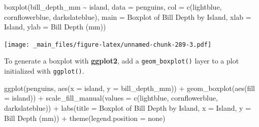 \documentclass[
]{book}
\newenvironment{Shaded}{\begin{snugshade}}{\end{snugshade}}
\newcommand{\AttributeTok}[1]{\textcolor[rgb]{0.77,0.63,0.00}{#1}}
\newcommand{\FunctionTok}[1]{\textcolor[rgb]{0.00,0.00,0.00}{#1}}
\newcommand{\NormalTok}[1]{#1}
\newcommand{\SpecialCharTok}[1]{\textcolor[rgb]{0.00,0.00,0.00}{#1}}
\newcommand{\StringTok}[1]{\textcolor[rgb]{0.31,0.60,0.02}{#1}}
\begin{document}
\begin{Shaded}
\begin{Highlighting}[]
\FunctionTok{boxplot}\NormalTok{(bill\_depth\_mm }\SpecialCharTok{\textasciitilde{}}\NormalTok{ island, }\AttributeTok{data =}\NormalTok{ penguins, }
        \AttributeTok{col =} \FunctionTok{c}\NormalTok{(}\StringTok{\textquotesingle{}lightblue\textquotesingle{}}\NormalTok{, }\StringTok{\textquotesingle{}cornflowerblue\textquotesingle{}}\NormalTok{, }\StringTok{\textquotesingle{}darkslateblue\textquotesingle{}}\NormalTok{),}
        \AttributeTok{main =} \StringTok{\textquotesingle{}Boxplot of Bill Depth by Island\textquotesingle{}}\NormalTok{, }
        \AttributeTok{xlab =} \StringTok{\textquotesingle{}Island\textquotesingle{}}\NormalTok{, }\AttributeTok{ylab =} \StringTok{\textquotesingle{}Bill Depth (mm)\textquotesingle{}}\NormalTok{)}
\end{Highlighting}
\end{Shaded}

\texttt{[image: \_main\_files/figure-latex/unnamed-chunk-289-3.pdf]}

To generate a boxplot with \textbf{ggplot2}, add a \texttt{geom\_boxplot()} layer to a plot initialized with \texttt{ggplot()}.

\begin{Shaded}
\begin{Highlighting}[]
\FunctionTok{ggplot}\NormalTok{(penguins, }\FunctionTok{aes}\NormalTok{(}\AttributeTok{x =}\NormalTok{ island, }\AttributeTok{y =}\NormalTok{ bill\_depth\_mm)) }\SpecialCharTok{+}
  \FunctionTok{geom\_boxplot}\NormalTok{(}\FunctionTok{aes}\NormalTok{(}\AttributeTok{fill =}\NormalTok{ island)) }\SpecialCharTok{+}
  \FunctionTok{scale\_fill\_manual}\NormalTok{(}\AttributeTok{values =} \FunctionTok{c}\NormalTok{(}\StringTok{\textquotesingle{}lightblue\textquotesingle{}}\NormalTok{, }\StringTok{\textquotesingle{}cornflowerblue\textquotesingle{}}\NormalTok{, }\StringTok{\textquotesingle{}darkslateblue\textquotesingle{}}\NormalTok{)) }\SpecialCharTok{+}
  \FunctionTok{labs}\NormalTok{(}\AttributeTok{title =} \StringTok{\textquotesingle{}Boxplot of Bill Depth by Island\textquotesingle{}}\NormalTok{, }
       \AttributeTok{x =} \StringTok{\textquotesingle{}Island\textquotesingle{}}\NormalTok{, }\AttributeTok{y =} \StringTok{\textquotesingle{}Bill Depth (mm)\textquotesingle{}}\NormalTok{) }\SpecialCharTok{+}
  \FunctionTok{theme}\NormalTok{(}\AttributeTok{legend.position =} \StringTok{\textquotesingle{}none\textquotesingle{}}\NormalTok{)}
\end{Highlighting}
\end{Shaded}
\end{document}
